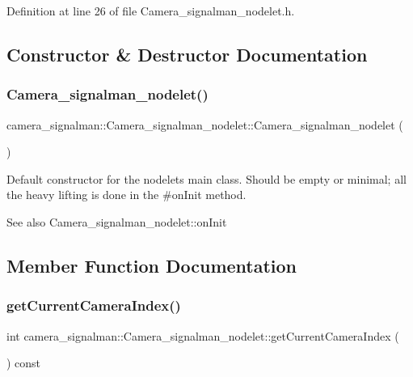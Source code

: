 Definition at line 26 of file Camera\+\_\+signalman\+\_\+nodelet.\+h.



\subsection{Constructor \& Destructor Documentation}
\mbox{\label{classcamera__signalman_1_1Camera__signalman__nodelet_aeda05ff39bb863e934381f914f55cc6e}} 
\subsubsection{\texorpdfstring{Camera\_signalman\_nodelet()}{Camera\_signalman\_nodelet()}}
{\footnotesize\ttfamily camera\+\_\+signalman\+::\+Camera\+\_\+signalman\+\_\+nodelet\+::\+Camera\+\_\+signalman\+\_\+nodelet (\begin{DoxyParamCaption}{ }\end{DoxyParamCaption})\hspace{0.3cm}{\ttfamily [default]}}

Default constructor for the nodelet\textquotesingle{}s main class. Should be empty or minimal; all the heavy lifting is done in the \#on\+Init method. \begin{DoxySeeAlso}{See also}
Camera\+\_\+signalman\+\_\+nodelet\+::on\+Init 
\end{DoxySeeAlso}


\subsection{Member Function Documentation}
\mbox{\label{classcamera__signalman_1_1Camera__signalman__nodelet_a321e800523b67be8f2250d068012e578}} 
\subsubsection{\texorpdfstring{getCurrentCameraIndex()}{getCurrentCameraIndex()}}
{\footnotesize\ttfamily int camera\+\_\+signalman\+::\+Camera\+\_\+signalman\+\_\+nodelet\+::get\+Current\+Camera\+Index (\begin{DoxyParamCaption}{ }\end{DoxyParamCaption}) const}

